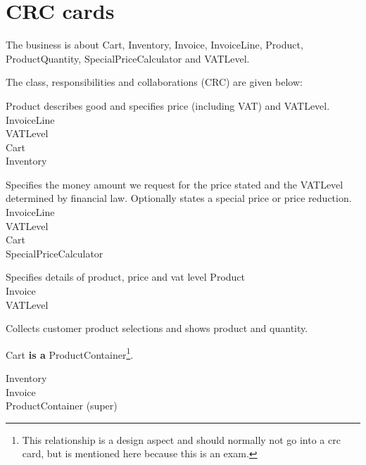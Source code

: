 \section{CRC cards}

The business is about Cart, Inventory, Invoice, InvoiceLine,
Product, ProductQuantity, SpecialPriceCalculator and VATLevel.

The class, responsibilities and collaborations (CRC) are given
below:

\begin{crccard}
  {
    Product describes good and specifies
    price (including VAT) and VATLevel.
  }
  {
    InvoiceLine\\
    VATLevel\\
    Cart\\
    Inventory
  }
\end{crccard}

\begin{crccard}
  {
    Specifies the money amount we request for the price stated and the
    VATLevel determined by financial law. Optionally states a special 
    price or price reduction.
  }{
    InvoiceLine\\
    VATLevel\\
    Cart\\
    SpecialPriceCalculator
  }
\end{crccard}

\begin{crccard}
  {
    Specifies details of product, price and vat level
  }{
    Product\\
    Invoice\\
    VATLevel
  }
\end{crccard}

\begin{crccard}
  {
    Collects customer product selections and shows product and
    quantity. 

    Cart \textbf{is a} ProductContainer\footnote{This
      relationship is a design aspect and should normally not go into
      a crc card, but is mentioned here because this is an exam.}.    
  }{
    Inventory\\
    Invoice\\
    ProductContainer (super)
  }
\end{crccard}

